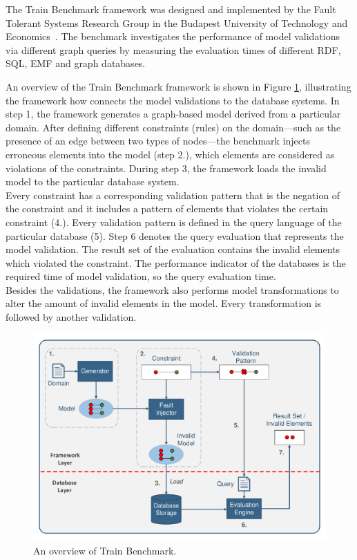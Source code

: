 The Train Benchmark framework was designed and implemented by the Fault Tolerant Systems Research Group in the Budapest University of Technology and Economics~\cite{tb_report}. The benchmark investigates the performance of model validations via different graph queries by measuring the evaluation times of different RDF, SQL, EMF and graph databases.

An overview of the Train Benchmark framework is shown in Figure \ref{fig:overview_train}, illustrating the framework how connects the model validations to the database systems. In step 1, the framework generates a graph-based model derived from a particular domain. After defining different constraints (rules) on the domain---such as the presence of an edge between two types of nodes---the benchmark injects erroneous elements into the model (step 2.), which elements are considered as violations of the constraints. During step 3, the framework loads the invalid model to the particular database system.\\
Every constraint has a corresponding validation pattern that is the negation of the constraint and it includes a pattern of elements that violates the certain constraint (4.). Every validation pattern is defined in the query language of the particular database (5). Step 6 denotes the query evaluation that represents the model validation. The result set of the evaluation contains the invalid elements which violated the constraint. The performance indicator of the databases is the required time of model validation, so the query evaluation time.\\
Besides the validations, the framework also performs model transformations to alter the amount of invalid elements in the model. Every transformation is followed by another validation.

\begin{figure}[!ht]
	\centering
	\includegraphics[width=150mm, keepaspectratio]{figures/functionality.pdf}
	\caption{An overview of Train Benchmark.}
	\label{fig:overview_train}
\end{figure}

